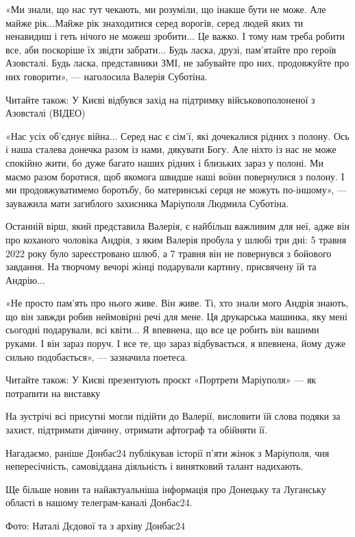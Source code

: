 «Ми знали, що нас тут чекають, ми розуміли, що інакше бути не може. Але майже
рік...Майже рік знаходитися серед ворогів, серед людей яких ти ненавидиш і геть
нічого не можеш зробити... Це важко. І тому нам треба робити все, аби поскоріше
їх звідти забрати... Будь ласка, друзі, пам'ятайте про героїв Азовсталі. Будь
ласка, представники ЗМІ, не забувайте про них, продовжуйте про них говорити», —
наголосила Валерія Суботіна.

Читайте також: У Києві відбувся захід на підтримку військовополоненої з
Азовсталі (ВІДЕО)

«Нас усіх об'єднує війна... Серед нас є сім'ї, які дочекалися рідних з полону.
Ось і наша сталева донечка разом із нами, дякувати Богу. Але ніхто із нас не
може спокійно жити, бо дуже багато наших рідних і близьких зараз у полоні. Ми
маємо разом боротися, щоб якомога швидше наші воїни повернулися з полону. І ми
продовжуватимемо боротьбу, бо материнські серця не можуть по-іншому», —
зауважила мати загиблого захисника Маріуполя Людмила Суботіна.

Останній вірш, який представила Валерія, є найбільш важливим для неї, адже він
про коханого чоловіка Андрія, з яким Валерія пробула у шлюбі три дні: 5 травня
2022 року було зареєстровано шлюб, а 7 травня він не повернувся з бойового
завдання. На творчому вечорі жінці подарували картину, присвячену їй та Андрію...

«Не просто пам'ять про нього живе. Він живе. Ті, хто знали мого Андрія знають,
що він завжди робив неймовірні речі для мене. Ця друкарська машинка, яку мені
сьогодні подарували, всі квіти... Я впевнена, що все це робить він вашими руками.
І він зараз поруч. І все те, що зараз відбувається, я впевнена, йому дуже
сильно подобається», — зазначила поетеса.

Читайте також: У Києві презентують проєкт «Портрети Маріуполя» — як потрапити
на виставку

На зустрічі всі присутні могли підійти до Валерії, висловити їй слова подяки за
захист, підтримати дівчину, отримати афтограф та обійняти її. 

Нагадаємо, раніше Донбас24 публікував історії п'яти жінок з Маріуполя, чия
непересічність, самовіддана діяльність і винятковий талант надихають.

Ще більше новин та найактуальніша інформація про Донецьку та Луганську області
в нашому телеграм-каналі Донбас24.

Фото: Наталі Дєдової та з архіву Донбас24
